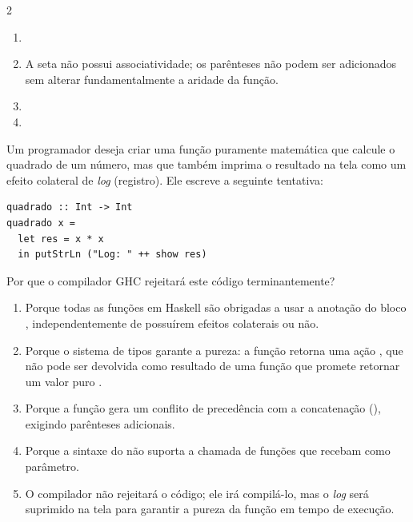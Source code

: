 \documentclass[a4paper,10pt,brazil]{article}
\begin{document}
\begin{multicols}{2}
\begin{enumerate}
  \item {}

  \item A seta não possui associatividade; os parênteses não podem ser adicionados sem alterar fundamentalmente a aridade da função.

  \item {}

  \item {}


\end{enumerate}

Um programador deseja criar uma função puramente matemática que calcule o quadrado de um número, mas que também imprima o resultado na tela como um efeito colateral de \emph{log} (registro). Ele escreve a seguinte tentativa:

\begin{verbatim}
quadrado :: Int -> Int
quadrado x = 
  let res = x * x
  in putStrLn ("Log: " ++ show res)
\end{verbatim}

Por que o compilador GHC rejeitará este código terminantemente?

\begin{enumerate}
  \item Porque todas as funções em Haskell são obrigadas a usar a anotação do bloco , independentemente de possuírem efeitos colaterais ou não.

  \item Porque o sistema de tipos garante a pureza: a função  retorna uma ação , que não pode ser devolvida como resultado de uma função que promete retornar um valor puro .

  \item Porque a função  gera um conflito de precedência com a concatenação (\haskellinline{++}), exigindo parênteses adicionais.

  \item Porque a sintaxe do  não suporta a chamada de funções que recebam  como parâmetro.

  \item O compilador não rejeitará o código; ele irá compilá-lo, mas o \emph{log} será suprimido na tela para garantir a pureza da função em tempo de execução.



\end{enumerate}
\end{multicols}
\end{document}
